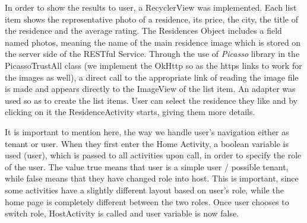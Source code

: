 \documentclass[12pt]{article}
\begin{document}
	In order to show the results to user, a RecyclerView was implemented. Each list item shows the representative photo of a residence, its price, the city, the title of the residence and the average rating. The Residences Object includes a field named photos, meaning the name of the main residence image which is stored on the server side of the RESTful Service. Through the use of \textit{Picasso} library in the PicassoTrustAll class (we implement the OkHttp so as the https links to work for the images as well), a direct call to the appropriate link of reading the image file is made and appears directly to the ImageView of the list item. An adapter was used so as to create the list items. User can select the residence they like and by clicking on it the ResidenceActivity starts, giving them more details.
	
	It is important to mention here, the way we handle user's navigation either as tenant or user. When they first enter the Home Activity, a boolean variable is used (user), which is passed to all activities upon call, in order to specify the role of the user. The value true means that user is a simple user / possible tenant, while false means that they have changed role into host. This is important, since some activities have a slightly different layout based on user's role, while the home page is completely different between the two roles. Once user chooses to switch role, HostActivity is called and user variable is now false.
	
\end{document}
